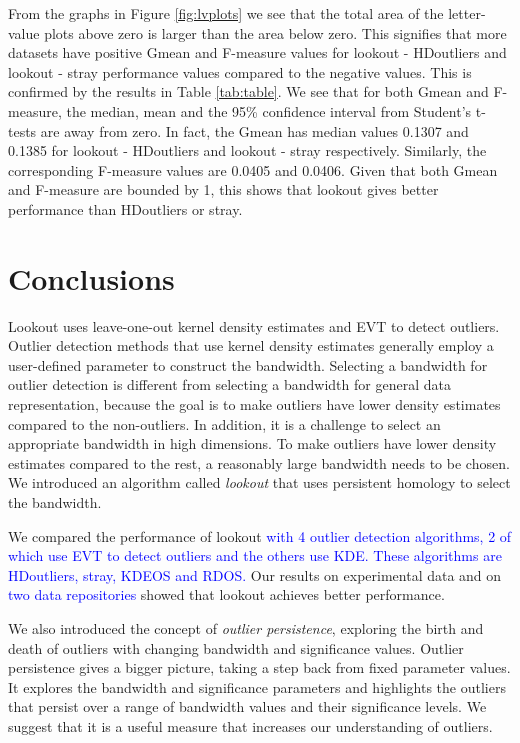 \documentclass[12pt]{article}
\theoremstyle{definition}
\theoremstyle{definition}
\theoremstyle{definition}
\theoremstyle{definition}
\theoremstyle{remark}
\begin{document}
From the graphs in Figure \ref{fig:lvplots} we see that the total area of the letter-value plots above zero is larger than the area below zero. This signifies that more datasets have positive Gmean and F-measure values for lookout - HDoutliers and lookout - stray performance values compared to the negative values. This is confirmed by the results in Table \ref{tab:table}. We see that for both Gmean and F-measure, the median, mean and the 95\% confidence interval from Student's t-tests are away from zero. In fact, the Gmean has median values 0.1307 and 0.1385 for lookout - HDoutliers and lookout - stray respectively. Similarly, the corresponding F-measure values are 0.0405 and 0.0406. Given that both Gmean and F-measure are bounded by 1, this shows that lookout gives better performance than HDoutliers or stray.

\hypertarget{sec:conclusions}{%
\section{Conclusions}\label{sec:conclusions}}

Lookout uses leave-one-out kernel density estimates and EVT to detect outliers. Outlier detection methods that use kernel density estimates generally employ a user-defined parameter to construct the bandwidth. Selecting a bandwidth for outlier detection is different from selecting a bandwidth for general data representation, because the goal is to make outliers have lower density estimates compared to the non-outliers. In addition, it is a challenge to select an appropriate bandwidth in high dimensions. To make outliers have lower density estimates compared to the rest, a reasonably large bandwidth needs to be chosen. We introduced an algorithm called \emph{lookout} that uses persistent homology to select the bandwidth.

We compared the performance of lookout \textcolor{blue}{with 4 outlier detection algorithms, 2 of which use EVT to detect outliers and the others use KDE. These algorithms are HDoutliers, stray, KDEOS and RDOS.} Our results on experimental data and on \textcolor{blue}{two data repositories} showed that lookout achieves better performance.

We also introduced the concept of \emph{outlier persistence}, exploring the birth and death of outliers with changing bandwidth and significance values. Outlier persistence gives a bigger picture, taking a step back from fixed parameter values. It explores the bandwidth and significance parameters and highlights the outliers that persist over a range of bandwidth values and their significance levels. We suggest that it is a useful measure that increases our understanding of outliers.
\end{document}
